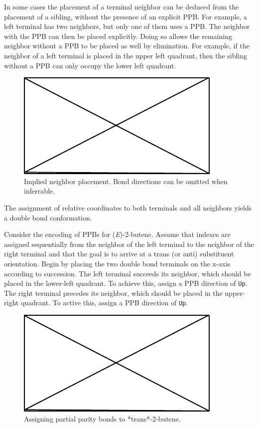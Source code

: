 \documentclass{article}
\def\ttt{\texttt}
\begin{document}
In some cases the placement of a terminal neighbor can be deduced from the placement of a sibling, without the presence of an explicit PPB. For example, a left terminal has two neighbors, but only one of them uses a PPB. The neighbor with the PPB can then be placed explicitly. Doing so allows the remaining neighbor without a PPB to be placed as well by elimination. For example, if the neighbor of a left terminal is placed in the upper left quadrant, then the sibling without a PPB can only occupy the lower left quadrant.

\begin{figure}
    \centering
    \includegraphics{filler}
    \caption{Implied neighbor placement. Bond directions can be omitted when inferrable.}
    \label{fig:implied-neighbor-placement}
\end{figure}

The assignment of relative coordinates to both terminals and all neighbors yields a double bond conformation.

Consider the encoding of PPBs for (\textit{E})-2-butene. Assume that indexes are assigned sequentially from the neighbor of the left terminal to the neighbor of the right terminal and that the goal is to arrive at a trans (or anti) substituent orientation. Begin by placing the two double bond terminals on the x-axis according to succession. The left terminal succeeds its neighbor, which should be placed in the lower-left quadrant. To achieve this, assign a PPB direction of \ttt{Up}. The right terminal precedes its neighbor, which should be placed in the upper-right quadrant. To active this, assign a PPB direction of \ttt{Up}.

\begin{figure}
    \centering
    \includegraphics{filler}
    \caption{Assigning partial parity bonds to *trans*-2-butene.}
    \label{fig:assigning-ppb}
\end{figure}
\end{document}
